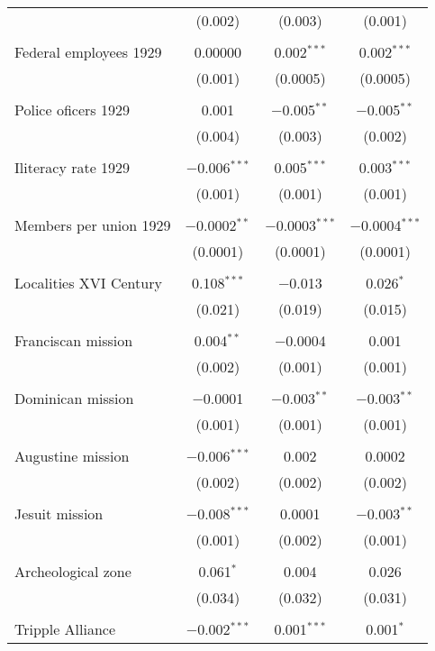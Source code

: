 \begin{table}[!htbp]
\begin{tabular}{@{\extracolsep{5pt}}lccc}
  & (0.002) & (0.003) & (0.001) \\ 
  & & & \\ 
 Federal employees 1929 & 0.00000 & 0.002$^{***}$ & 0.002$^{***}$ \\ 
  & (0.001) & (0.0005) & (0.0005) \\ 
  & & & \\ 
 Police oficers 1929 & 0.001 & $-$0.005$^{**}$ & $-$0.005$^{**}$ \\ 
  & (0.004) & (0.003) & (0.002) \\ 
  & & & \\ 
 Iliteracy rate 1929 & $-$0.006$^{***}$ & 0.005$^{***}$ & 0.003$^{***}$ \\ 
  & (0.001) & (0.001) & (0.001) \\ 
  & & & \\ 
 Members per union 1929 & $-$0.0002$^{**}$ & $-$0.0003$^{***}$ & $-$0.0004$^{***}$ \\ 
  & (0.0001) & (0.0001) & (0.0001) \\ 
  & & & \\ 
 Localities XVI Century & 0.108$^{***}$ & $-$0.013 & 0.026$^{*}$ \\ 
  & (0.021) & (0.019) & (0.015) \\ 
  & & & \\ 
 Franciscan mission & 0.004$^{**}$ & $-$0.0004 & 0.001 \\ 
  & (0.002) & (0.001) & (0.001) \\ 
  & & & \\ 
 Dominican mission & $-$0.0001 & $-$0.003$^{**}$ & $-$0.003$^{**}$ \\ 
  & (0.001) & (0.001) & (0.001) \\ 
  & & & \\ 
 Augustine mission & $-$0.006$^{***}$ & 0.002 & 0.0002 \\ 
  & (0.002) & (0.002) & (0.002) \\ 
  & & & \\ 
 Jesuit mission & $-$0.008$^{***}$ & 0.0001 & $-$0.003$^{**}$ \\ 
  & (0.001) & (0.002) & (0.001) \\ 
  & & & \\ 
 Archeological zone & 0.061$^{*}$ & 0.004 & 0.026 \\ 
  & (0.034) & (0.032) & (0.031) \\ 
  & & & \\ 
 Tripple Alliance & $-$0.002$^{***}$ & 0.001$^{***}$ & 0.001$^{*}$ \\ 

\end{tabular}
\end{table}
